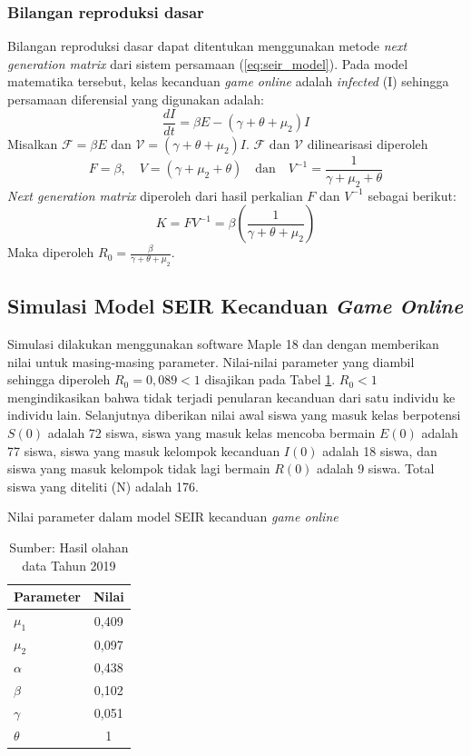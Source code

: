 \documentclass[a4paper, 12pt]{article}
\begin{document}
\subsubsection{Bilangan reproduksi dasar}
Bilangan reproduksi dasar dapat ditentukan menggunakan metode \textit{next generation matrix} dari sistem persamaan (\ref{eq:seir_model}). Pada model matematika tersebut, kelas kecanduan \textit{game online} adalah \textit{infected} (I) sehingga persamaan diferensial yang digunakan adalah:
\[ \frac{dI}{dt} = \beta E - (\gamma + \theta + \mu_2)I \]
Misalkan $\mathcal{F} = \beta E$ dan $\mathcal{V} = (\gamma + \theta + \mu_2)I$. $\mathcal{F}$ dan $\mathcal{V}$ dilinearisasi diperoleh
\[ F = \beta, \quad V = (\gamma + \mu_2 + \theta) \quad \text{dan} \quad V^{-1} = \frac{1}{\gamma+\mu_2+\theta} \]
\textit{Next generation matrix} diperoleh dari hasil perkalian $F$ dan $V^{-1}$ sebagai berikut:
\[ K = FV^{-1} = \beta \left( \frac{1}{\gamma + \theta + \mu_2} \right) \]
Maka diperoleh $R_0 = \frac{\beta}{\gamma+\theta+\mu_2}$.

\subsection{Simulasi Model SEIR Kecanduan \textit{Game Online}}
Simulasi dilakukan menggunakan software Maple 18 dan dengan memberikan nilai untuk masing-masing parameter. Nilai-nilai parameter yang diambil sehingga diperoleh $R_0 = 0,089 < 1$ disajikan pada Tabel \ref{tab:simulasi_parameter}. $R_0 < 1$ mengindikasikan bahwa tidak terjadi penularan kecanduan dari satu individu ke individu lain. Selanjutnya diberikan nilai awal siswa yang masuk kelas berpotensi $S(0)$ adalah 72 siswa, siswa yang masuk kelas mencoba bermain $E(0)$ adalah 77 siswa, siswa yang masuk kelompok kecanduan $I(0)$ adalah 18 siswa, dan siswa yang masuk kelompok tidak lagi bermain $R(0)$ adalah 9 siswa. Total siswa yang diteliti (N) adalah 176.

\begin{table}[h!]
    \centering
    \caption{Nilai parameter dalam model SEIR kecanduan \textit{game online}}
    \label{tab:simulasi_parameter}
    \begin{tabular}{@{}lc@{}}
        \toprule
        Parameter & Nilai \\
        \midrule
        $\mu_1$ & 0,409 \\
        $\mu_2$ & 0,097 \\
        $\alpha$ & 0,438 \\
        $\beta$ & 0,102 \\
        $\gamma$ & 0,051 \\
        $\theta$ & 1 \\
        \bottomrule
    \end{tabular}
    \caption*{\footnotesize Sumber: Hasil olahan data Tahun 2019}
\end{table}
\end{document}

